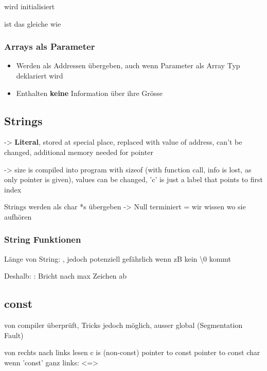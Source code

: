 \begin{multicols*}{4}
 wird initialisiert

 ist das gleiche wie 

\subsubsection{Arrays als Parameter}
\begin{itemize}
    \item Werden als Addressen übergeben, auch wenn Parameter als Array Typ deklariert wird
    \item Enthalten \textbf{keine} Information über ihre Grösse
\end{itemize}

\subsection{Strings}
 -> \textbf{Literal}, stored at special place, replaced with value of address, can't be changed, additional memory needed for pointer

 -> size is compiled into program with sizeof (with function call, info is lost, as only pointer is given), values can be changed, 'c' is just a label that points to first index

Strings werden als char *s übergeben -> Null terminiert = wir wissen wo sie aufhören

\subsubsection{String Funktionen}
Länge von String: , jedoch potenziell gefährlich wenn zB kein \textbackslash0 kommt

Deshalb: : Bricht nach max Zeichen ab


\subsection{const}
von compiler überprüft, Tricks jedoch möglich, ausser global (Segmentation Fault)\vspace{2pt}

von rechts nach links lesen
\newline c is (non-const) pointer to const pointer to const char
\vspace{4pt}
wenn 'const' ganz links:  <=> 


\end{multicols*}
